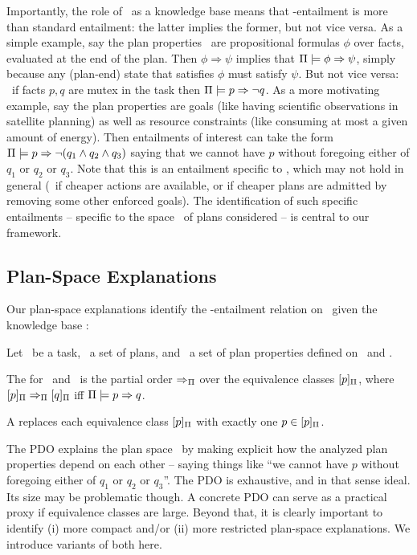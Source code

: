 Importantly, the role of \plans\ as a knowledge base means that
\plans-entailment is more than standard entailment: the latter implies
the former, but not vice versa. As a simple example, say the plan
properties \props\ are propositional formulas $\phi$ over facts,
evaluated at the end of the plan. Then $\phi \Rightarrow \psi$ implies
that $\Pi \models \phi \Rightarrow \psi$, simply because any (plan-end)
state that satisfies $\phi$ must satisfy $\psi$. But not vice versa:
\eg\ if facts $p, q$ are mutex in the task then
$\Pi \models p \Rightarrow \neg q$. As a more motivating example, say the
plan properties are goals (like having scientific observations in
satellite planning) as well as resource constraints (like consuming at
most a given amount of energy). Then entailments of interest can take
the form $\Pi \models p \Rightarrow \neg (q_1 \wedge q_2 \wedge q_3)$
saying that we cannot have $p$ without foregoing either of $q_1$ or
$q_2$ or $q_3$. Note that this is an entailment specific to \plans,
which may not hold in general (\eg\ if cheaper actions are available,
or if cheaper plans are admitted by removing some other enforced
goals). The identification of such specific entailments -- specific to
the space \plans\ of plans considered -- is central to our framework.





\subsection{Plan-Space Explanations}

Our plan-space explanations identify the \plans-entailment relation on
\props\ given the knowledge base \plans:

\begin{definition}
Let \task\ be a task, \plans\ a set of plans, and \props\ a set of
plan properties defined on \task\ and \plans.

The  for \plans\ and
\props\ is the partial order $\Rightarrow_{\Pi}$ over the equivalence
classes $[p]_{\Pi}$, where $[p]_{\Pi}
\Rightarrow_{\Pi} [q]_{\Pi}$ iff
$\Pi \models p \Rightarrow q$.

A  replaces each equivalence class
$[p]_{\Pi}$ with exactly one $p \in
[p]_{\Pi}$.
\end{definition}

The PDO explains the plan space \plans\ by making explicit how the
analyzed plan properties depend on each other -- saying things like
``we cannot have $p$ without foregoing either of $q_1$ or $q_2$ or
$q_3$''. The PDO is exhaustive, and in that sense ideal. Its size may
be problematic though. A concrete PDO can serve as a practical proxy
if equivalence classes are large. Beyond that, it is clearly important
to identify (i) more compact and/or (ii) more restricted plan-space
explanations. We introduce variants of both here. 

